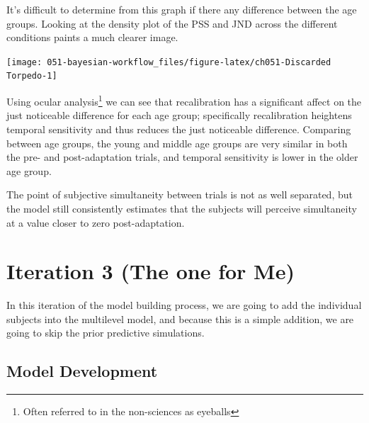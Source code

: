 \documentclass[11pt, oneside, openany]{scrbook}
\begin{document}
It's difficult to determine from this graph if there any difference between the age groups. Looking at the density plot of the PSS and JND across the different conditions paints a much clearer image.

\begin{center}\texttt{[image: 051-bayesian-workflow\_files/figure-latex/ch051-Discarded Torpedo-1]} \end{center}

Using ocular analysis\footnote{Often referred to in the non-sciences as eyeballs} we can see that recalibration has a significant affect on the just noticeable difference for each age group; specifically recalibration heightens temporal sensitivity and thus reduces the just noticeable difference. Comparing between age groups, the young and middle age groups are very similar in both the pre- and post-adaptation trials, and temporal sensitivity is lower in the older age group.

The point of subjective simultaneity between trials is not as well separated, but the model still consistently estimates that the subjects will perceive simultaneity at a value closer to zero post-adaptation.

\hypertarget{iteration-3-the-one-for-me}{%
\section{Iteration 3 (The one for Me)}\label{iteration-3-the-one-for-me}}

In this iteration of the model building process, we are going to add the individual subjects into the multilevel model, and because this is a simple addition, we are going to skip the prior predictive simulations.

\hypertarget{model-development}{%
\subsection{Model Development}\label{model-development}}
\end{document}
